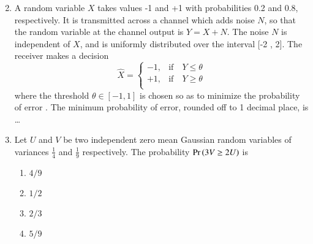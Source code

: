 \begin{enumerate}[label=\thesection.\arabic*.,ref=\thesection.\theenumi]
\begin{enumerate}
\begin{multicols}{2}
\end{multicols}
\end{enumerate}

\item A random variable $X$ takes values -1 and +1 with probabilities 0.2 and 0.8, respectively.
It is transmitted across a channel which adds noise $N$, so that the random variable at the
channel output is $Y = X + N$. The noise $N$ is independent of $X$, and is uniformly
distributed over the interval [-2 , 2]. The receiver makes a decision
\[
\hat{X} = \begin{cases}
            -1, &\text{if}\quad Y \leq \theta \\
             +1, &\text{if}\quad Y \geq \theta\\
            \end{cases}
\]
where the threshold $\theta  \in [-1,1]$ is chosen so as to minimize the probability of error
. The minimum probability of error, rounded off to 1 decimal place, is \dots
\\
\solution


%
\item  Let $U$ and $V$ be two independent zero mean Gaussian random variables of variances $\frac{1}{4}$ and $\frac{1}{9}$ respectively. The probability $\Pr\left(3V\geq2U \right)$ is
\begin{enumerate}
    \item $4/9$
    \item $1/2$
    \item $2/3$
    \item $5/9$
\end{enumerate}
%
\solution

%


\end{enumerate}